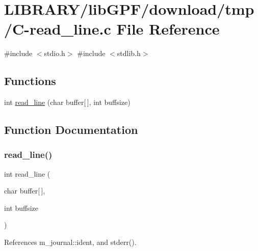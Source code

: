 \hypertarget{C-read__line_8c}{}\section{L\+I\+B\+R\+A\+R\+Y/lib\+G\+P\+F/download/tmp/\+C-\/read\+\_\+line.c File Reference}
\label{C-read__line_8c}
{\ttfamily \#include $<$stdio.\+h$>$}\newline
{\ttfamily \#include $<$stdlib.\+h$>$}\newline
\subsection*{Functions}
\begin{DoxyCompactItemize}
\item 
int \hyperlink{C-read__line_8c_aa70fff09f4f198b81612596f3c466af1}{read\+\_\+line} (char buffer\mbox{[}$\,$\mbox{]}, int buffsize)
\end{DoxyCompactItemize}


\subsection{Function Documentation}
\mbox{\label{C-read__line_8c_aa70fff09f4f198b81612596f3c466af1}} 
\subsubsection{\texorpdfstring{read\+\_\+line()}{read\_line()}}
{\footnotesize\ttfamily int read\+\_\+line (\begin{DoxyParamCaption}\item[{char}]{buffer\mbox{[}$\,$\mbox{]},  }\item[{int}]{buffsize }\end{DoxyParamCaption})}



References m\+\_\+journal\+::ident, and stderr().

